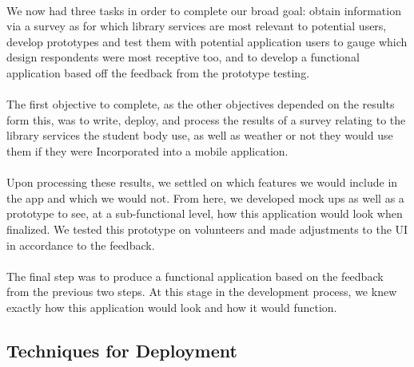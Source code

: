     \paragraph{}
    We now had three tasks in order to complete our broad goal: obtain information via a survey as for which library services are most relevant to potential users, develop prototypes and test them with potential application users to gauge which design respondents were most receptive too, and to develop a functional application based off the feedback from the prototype testing.  
    \paragraph{}
    The first objective to complete, as the other objectives depended on the results form this, was to write, deploy, and process the results of a survey relating to the library services the student body use, as well as weather or not they would use them if they were Incorporated into a mobile application.
    \paragraph{}
    Upon processing these results, we settled on which features we would include in the app and which we would not. From here, we developed mock ups as well as a prototype to see, at a sub-functional level, how this application would look when finalized. We tested this prototype on volunteers and made adjustments to the UI in accordance to the feedback. 
    \paragraph{}
    The final step was to produce a functional application based on the feedback from the previous two steps. At this stage in the development process, we knew exactly how this application would look and how it would function. 
    
    
    \newpage
    \subsection{Techniques for Deployment} %
    \paragraph{}



